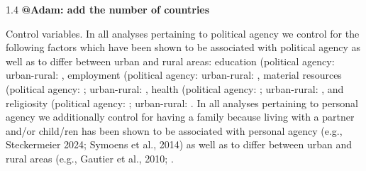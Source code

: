 \documentclass[10pt, letterpaper]{article}
\begin{document}
\begin{spacing}{1.4}
\textbf{@Adam: add the number of countries}


Control variables. 
In all analyses pertaining to political agency we control for the following
factors which have been shown to be associated with political agency as well as
to differ between urban and rural areas: education (political agency:
\citep{emmenegger2015labour,garcia2024they,marx2016unemployed,rowland2024political}
urban-rural: \citep{van2021urban,zahl2024spatial}, employment (political agency:
\citet{emmenegger2015labour,luukkonen2022urbanisation,marx2016unemployed}
urban-rural: \citet{e26,ananian2024employment}, material resources (political
agency: 
\citet{emmenegger2015labour,luukkonen2022urbanisation,marx2016unemployed,rowland2024political}
; urban-rural:
 \citet{finnemann2024urban,kpatcha2026unlocking,meloni2024rural}, health
 (political agency: \citet{garcia2024they,gidengil2024healthy,shore2019health};
 urban-rural: \citet{mackinnon2023mapping,menashe2022shifting}, and religiosity
 (political agency: \citet{marx2016unemployed,rowland2024political} ;
 urban-rural: \citet{balazka2020mapping,meulemann2020secularization}. 
In all analyses pertaining to personal agency we additionally control for having
a family because living with a partner and/or child/ren has been shown to be
associated with personal agency (e.g., \citet{nikolaev2016give} Steckermeier
2024; Symoens et al., 2014) as well as to differ between urban and rural areas
(e.g., Gautier et al., 2010; \citet{stockdale2014life}.


\end{spacing}
\end{document}
